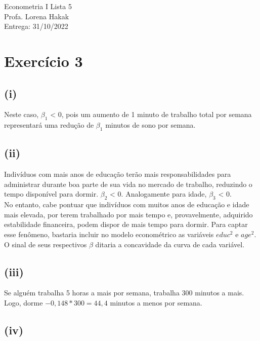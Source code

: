 \documentclass[hidelinks,11pt]{book}
\theoremstyle{definition}
\begin{document}
	\begin{center}
	{\Large Econometria I \hspace{0.5cm} Lista 5}\\
	Profa. Lorena Hakak\\
	Entrega: 31/10/2022
\end{center}

\vspace{0.2 cm}



\section*{Exercício 3}

\subsection*{(i)}

Neste caso, $\beta_1$ < 0, pois um aumento de 1 minuto de trabalho total por semana representará uma redução de $\beta_1$ minutos de sono por semana.

\subsection*{(ii)}

Indivíduos com mais anos de educação terão mais responsabilidades para administrar durante boa parte de sua vida no mercado de trabalho, reduzindo o tempo disponível para dormir. $\beta_2$ < 0. Analogamente para idade, $\beta_3$ < 0.\\

No entanto, cabe pontuar que indivíduos com muitos anos de educação e idade mais elevada, por terem trabalhado por mais tempo e, provavelmente, adquirido estabilidade financeira, podem dispor de mais tempo para dormir. Para captar esse fenômeno, bastaria incluir no modelo econométrico as variáveis $educ^2$ e $age^2$. O sinal de seus respectivos $\beta$ ditaria a concavidade da curva de cada variável.

\subsection*{(iii)}

Se alguém trabalha 5 horas a mais por semana, trabalha 300 minutos a mais. Logo, dorme $- 0,148*300 = 44,4$ minutos a menos por semana.

\subsection*{(iv)}
\end{document}
